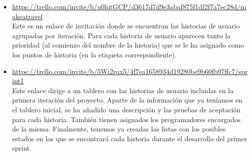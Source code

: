 \documentclass[11pt]{article}
\begin{document}
\begin{itemize}
\item \url{https://trello.com/invite/b/u0lqtGCP/d3617d7d9e3abaf875f1df2f7a7ec28d/makeatravel} \\

Este es un enlace de invitación donde se encuentran las historias de usuario agrupadas por iteración. Para cada historia de usuario aparecen tanto la prioridad (al comienzo del nombre de la historia) que se le ha asignado como los puntos de historia (en la etiqueta correspondiente).

\item \url{https://trello.com/invite/b/5Wi2rqx5/4f7ea1658934d19280be9b60fb97ffc7/sprint1} \\

Este enlace dirige a un tablero con las historias de usuario incluidas en la primera iteración del proyecto. Aparte de la información que ya teníamos en el tablero inicial, se ha añadido una descripción y las pruebas de aceptación para cada historia. También tienen asignados los programadores encargados de la misma. Finalmente, tenemos ya creadas las listas con los posibles estados en los que se encontrará cada historia durante el desarrollo del primer sprint. 
\end{itemize}
\end{document}
